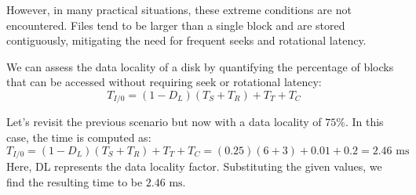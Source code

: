 However, in many practical situations, these extreme conditions are not encountered. 
Files tend to be larger than a single block and are stored contiguously, mitigating the need for frequent seeks and rotational latency.

We can assess the data locality of a disk by quantifying the percentage of blocks that can be accessed without requiring seek or rotational latency: 
\[T_{I/0}=(1-D_L)(T_{S}+T_{R})+T_{T}+T_{C}\]
\begin{example}
    Let's revisit the previous scenario but now with a data locality of $75\%$. 
    In this case, the time is computed as:
    \[T_{I/0}=(1-D_L)(T_{S}+T_{R})+T_{T}+T_{C}=(0.25)(6+3)+0.01+0.2=2.46\text{ ms}\]
    Here, DL represents the data locality factor. 
    Substituting the given values, we find the resulting time to be $2.46\text{ ms}$.
\end{example}

